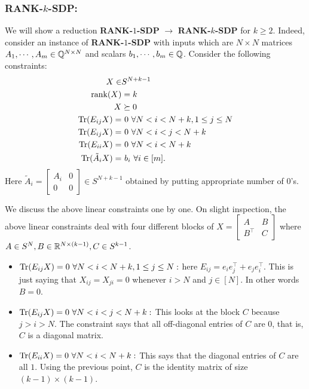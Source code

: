 \subsubsection*{RANK-$k$-SDP:}
We will show a reduction \textbf{RANK-$1$-SDP} $\longrightarrow$ \textbf{RANK-$k$-SDP} for $k\ge 2$. Indeed, consider an instance of \textbf{RANK-$1$-SDP} with inputs which are $N\times N$ matrices $A_{1},\cdots,A_{m}\in \mathbb{Q}^{N\times N}$ and scalars $b_{1},\cdots,b_{m}\in\mathbb{Q}$. Consider the following constraints: 
\begin{equation}\label{rkk}
\begin{aligned}
X\in& S^{N+k-1}\\
\operatorname{rank}(X) &= k\\
X&\succeq 0\\
\operatorname{Tr}(E_{ij} X) =&~ 0 ~\forall N < i < N+k, 1\le j\le N\\
\operatorname{Tr}(E_{ij} X) =&~ 0 ~\forall N < i< j< N+k\\
\operatorname{Tr}(E_{ii} X) =&~ 0 ~\forall N < i < N+k\\
\operatorname{Tr}(\tilde A_{i}X) =&~ b_{i}~\forall i \in[m].
\end{aligned}
\end{equation}
Here $\tilde A_{i} = \begin{bmatrix}A_{i}&0\\0&0\end{bmatrix}\in S^{N+k-1}$ obtained by putting appropriate number of $0$'s.

We discuss the above linear constraints one by one. On slight inspection, the above linear constraints deal with four different blocks of $X = \begin{bmatrix}A & B\\B^{\top}&C\end{bmatrix}$ where $A\in S^{N}, B\in \mathbb{R}^{N\times(k-1)}, C\in S^{k-1}$.
\begin{itemize}
\item $\operatorname{Tr}(E_{ij} X) = 0 ~\forall N < i < N+k, 1\le j\le N:$ here $E_{ij} = e_{i}e_{j}^{\top}+e_{j}e_{i}^{\top}$. This is just saying that $X_{ij} = X_{ji} = 0$ whenever $i>N$ and $j\in [N]$. In other words $B=0$.
\item $\operatorname{Tr}(E_{ij} X) = 0 ~\forall N < i< j< N+k:$  This looks at the block $C$ because $j>i>N$. The constraint says that all off-diagonal entries of $C$ are $0$, that is, $C$ is a diagonal matrix.
\item $\operatorname{Tr}(E_{ii} X) = 0 ~\forall N < i < N+k:$ This says that the diagonal entries of $C$ are all $1$. Using the previous point, $C$ is the identity matrix of size $(k-1)\times (k-1)$.
\end{itemize}

